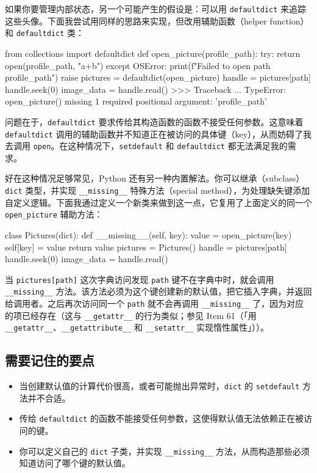 如果你要管理内部状态，另一个可能产生的假设是：可以用 \texttt{defaultdict} 来追踪这些头像。下面我尝试用同样的思路来实现，但改用辅助函数（helper function）和 \texttt{defaultdict} 类：

\begin{codebox}[python]
from collections import defaultdict
def open_picture(profile_path):
    try:
        return open(profile_path, "a+b")
    except OSError:
        print(f"Failed to open path {profile_path}")
        raise
pictures = defaultdict(open_picture)
handle = pictures[path]
handle.seek(0)
image_data = handle.read()
>>>
Traceback ...
TypeError: open_picture() missing 1 required positional
argument: 'profile_path'
\end{codebox}

问题在于，\texttt{defaultdict} 要求传给其构造函数的函数不接受任何参数。这意味着 \texttt{defaultdict} 调用的辅助函数并不知道正在被访问的具体键（key），从而妨碍了我去调用 \texttt{open}。在这种情况下，\texttt{setdefault} 和 \texttt{defaultdict} 都无法满足我的需求。

好在这种情况足够常见，Python 还有另一种内置解法。你可以继承（subclass）\texttt{dict} 类型，并实现 \texttt{\_\_missing\_\_} 特殊方法（special method），为处理缺失键添加自定义逻辑。下面我通过定义一个新类来做到这一点，它复用了上面定义的同一个 \texttt{open\_picture} 辅助方法：

\begin{codebox}[python]
class Pictures(dict):
    def __missing__(self, key):
        value = open_picture(key)
        self[key] = value
        return value
pictures = Pictures()
handle = pictures[path]
handle.seek(0)
image_data = handle.read()
\end{codebox}

当 \texttt{pictures[path]} 这次字典访问发现 \texttt{path} 键不在字典中时，就会调用 \texttt{\_\_missing\_\_} 方法。该方法必须为这个键创建新的默认值，把它插入字典，并返回给调用者。之后再次访问同一个 \texttt{path} 就不会再调用 \texttt{\_\_missing\_\_} 了，因为对应的项已经存在（这与 \texttt{\_\_getattr\_\_} 的行为类似；参见 Item 61（「用 \texttt{\_\_getattr\_\_}、\texttt{\_\_getattribute\_\_} 和 \texttt{\_\_setattr\_\_} 实现惰性属性」））。

\subsection{需要记住的要点}
\begin{itemize}
\item 当创建默认值的计算代价很高，或者可能抛出异常时，\texttt{dict} 的 \texttt{setdefault} 方法并不合适。
\item 传给 \texttt{defaultdict} 的函数不能接受任何参数，这使得默认值无法依赖正在被访问的键。
\item 你可以定义自己的 \texttt{dict} 子类，并实现 \texttt{\_\_missing\_\_} 方法，从而构造那些必须知道访问了哪个键的默认值。
\end{itemize}

